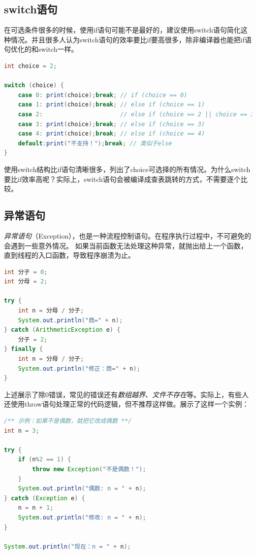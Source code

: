 \subsection{switch语句}
在可选条件很多的时候，使用if语句可能不是最好的，建议使用switch语句简化这种情况。并且很多人认为switch语句的效率要比if要高很多，除非编译器也能把if语句优化的和switch一样。
\begin{lstlisting}[language=Java, caption={switch语句}, label=code:part1_switch_case ]
int choice = 2;

switch (choice) {
    case 0: print(choice);break; // if (choice == 0)
    case 1: print(choice);break; // else if (choice == 1)
    case 2:                      // else if (choice == 2 || choice == 3)
    case 3: print(choice);break; // else if (choice == 3)
    case 4: print(choice);break; // else if (choice == 4)
    default:print("不支持！");break; // 类似于else
}
\end{lstlisting}
使用switch结构比if语句清晰很多，列出了choice可选择的所有情况。为什么switch要比if效率高呢？实际上，switch语句会被编译成查表跳转的方式，不需要逐个比较。


\subsection{异常语句}
\emph{异常语句}（Exception），也是一种流程控制语句。在程序执行过程中，不可避免的会遇到一些意外情况。
如果当前函数无法处理这种异常，就抛出给上一个函数，直到线程的入口函数，导致程序崩溃为止。

\begin{lstlisting}[language=Java, caption={异常语句}, label=code:part1_exception_clause ]
int 分子 = 0;
int 分母 = 2;

try {
    int n = 分母 / 分子;
    System.out.println("商=" + n);
} catch (ArithmeticException e) {
    分子 = 2;
} finally {
    int n = 分母 / 分子;
    System.out.println("修正：商=" + n);
}
\end{lstlisting}

上述展示了除0错误，常见的错误还有\emph{数组越界}、\emph{文件不存在}等。实际上，有些人还使用throw语句处理正常的代码逻辑，但不推荐这样做。展示了这样一个实例：
\begin{lstlisting}[language=Java, caption={throw语句}, label=code:part1_exception_throw ]
/** 示例：如果不是偶数，就把它改成偶数 **/
int n = 3;

try {
    if (n%2 == 1) {
        throw new Exception("不是偶数！");
    }
    System.out.println("偶数: n = " + n);
} catch (Exception e) {
    n = n + 1;
    System.out.println("修改: n = " + n);
}

System.out.println("现在：n = " + n);
\end{lstlisting}


